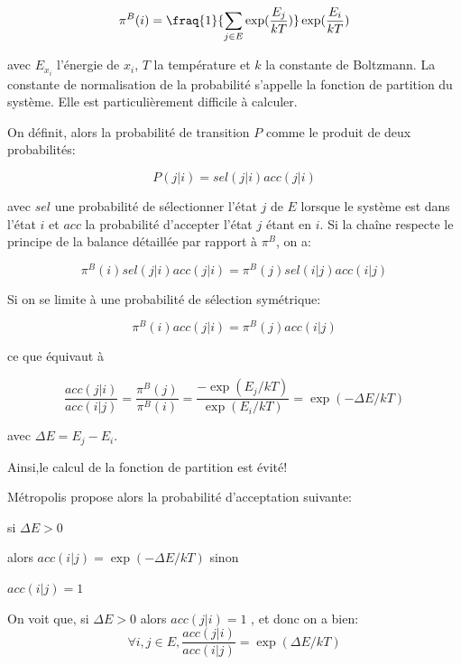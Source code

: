 \begin{equation}
\pi^B(i) = \fraq{1}{\sum_{j \in E}\exp(\frac{E_j}{kT})} \exp(\frac{E_i}{kT})
\end{equation}

avec $E_{x_i}$  l'énergie de $x_i$, $T$ la température et $k$ la constante de Boltzmann. La constante de normalisation de la probabilité s'appelle la fonction de partition du système. Elle est particulièrement difficile à calculer.

On définit, alors la probabilité de transition $P$ comme le produit de deux probabilités:

\begin{equation}
  \label{decomp_Metro}
P (j|i) = sel(j|i)acc(j|i)
\end{equation}

avec $sel$ une probabilité de sélectionner l'état $j$ de $E$ lorsque le système est dans l'état $i$ et $acc$ la probabilité d'accepter l'état $j$ étant en $i$. Si la chaîne respecte le principe de la balance détaillée par rapport à $\pi^B$, on a:

\begin{equation}
  \label{balance}
\pi^B(i)sel(j|i)acc(j|i) = \pi^B(j)sel(i|j)acc(i|j) 
\end{equation}

Si on se limite à une probabilité de sélection symétrique:

\begin{equation}
\pi^B(i)acc(j|i) = \pi^B(j)acc(i|j) 
\end{equation}

ce que équivaut à

\begin{equation}
  \label{fraq_Metropolis}
\frac{acc(j|i)}{acc(i|j)} =\frac{\pi^B(j)}{\pi^B(i)} = \frac{-\exp(E_j/kT)}{\exp(E_i/kT)} = \exp(-\Delta E/kT) 
\end{equation}

avec $\Delta E =  E_j - E_i$.

Ainsi,le calcul de la fonction de partition est évité!

Métropolis propose alors la probabilité d'acceptation suivante:


si $\Delta E >0$

alors $acc(i|j) = \exp(- \Delta E/kT)$
sinon

$acc(i|j)=1$

On voit que, si $\Delta E >0$ alors $acc(j|i)=1$ , et donc  on a bien:
\begin{equation}
\forall i,j \in E ,\frac{acc(j|i)}{acc(i|j)} = \exp(\Delta E/kT)
\end{equation}

